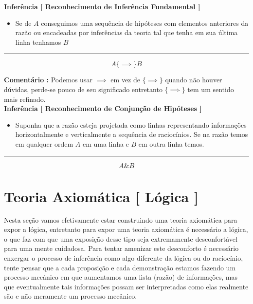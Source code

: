 \documentclass[10pt,a4paper]{report}
\begin{document}


\textbf{Inferência [ Reconhecimento de Inferência Fundamental ]}
\begin{itemize}
	\item[ ] Se de $A$ conseguimos uma sequência de hipóteses com elementos anteriores da razão ou encadeadas por inferências da teoria tal que tenha em sua última linha tenhamos $B$
\end{itemize}
\hrule

$$ A \{ \implies \} B $$

\textbf{Comentário :} Podemos usar $\implies$ em vez de $\{ \implies \}$ quando não houver dúvidas, perde-se pouco de seu significado entretanto $\{ \implies \}$ tem um sentido mais refinado.\\

\textbf{Inferência [ Reconhecimento de Conjunção de Hipóteses ]}
\begin{itemize}
	\item[ ] Suponha que a razão esteja projetada como linhas representando informações horizontalmente e verticalmente a sequência de raciocínios. Se na razão temos em qualquer ordem $A$ em uma linha e $B$ em outra linha temos.
\end{itemize}
\hrule

$$ A \& B $$


\section{Teoria Axiomática [ Lógica ]}

\hspace{\baselineskip}

Nesta seção vamos efetivamente estar construindo uma teoria axiomática para expor a lógica, entretanto para expor uma teoria axiomática é necessário a lógica, o que faz com que uma exposição desse tipo seja extremamente desconfortável para uma mente cuidadosa. Para tentar amenizar este desconforto é necessário enxergar o processo de inferência como algo diferente da lógica ou do raciocínio, tente pensar que a cada proposição e cada demonstração estamos fazendo um processo mecânico em que aumentamos uma lista (razão) de informações, mas que eventualmente tais informações possam ser interpretadas como elas realmente são e não meramente um processo mecânico.\\
\end{document}
